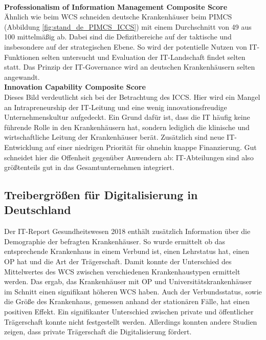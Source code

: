 \vspace{\parheadvspace}\\
\textbf{Professionalism of Information Management Composite Score}\\
Ähnlich wie beim WCS schneiden deutsche Krankenhäuser beim PIMCS (Abbildung \ref{fig:stand_de_PIMCS_ICCS}) mit einem Durchschnitt von 49 aus 100 mittelmäßig ab. Dabei sind die Defizitbereiche auf der taktische und insbesondere auf der strategischen Ebene. So wird der potentielle Nutzen von IT-Funktionen selten untersucht und Evaluation der IT-Landschaft findet selten statt. Das Prinzip der IT-Governance wird an deutschen Krankenhäusern selten angewandt.
\vspace{\parheadvspace}\\
\textbf{Innovation Capability Composite Score}\\
Dieses Bild verdeutlicht sich bei der Betrachtung des ICCS. Hier wird ein Mangel an Intrapreneurship der IT-Leitung und eine wenig innovationsfreudige Unternehmenskultur aufgedeckt. Ein Grund dafür ist, dass die IT häufig keine führende Rolle in den Krankenhäusern hat, sondern lediglich die klinische und wirtschaftliche Leitung der Krankenhäuser berät. Zusätzlich sind neue IT-Entwicklung auf einer niedrigen Priorität für ohnehin knappe Finanzierung. Gut schneidet hier die Offenheit gegenüber Anwendern ab: IT-Abteilungen sind also größtenteils gut in das Gesamtunternehmen integriert.
\subsection{Treibergrößen für Digitalisierung in Deutschland}
Der IT-Report Gesundheitswesen 2018 enthält zusätzlich Information über die Demographie der befragten Krankenhäuser. So wurde ermittelt ob das entsprechende Krankenhaus in einem Verbund ist, einen Lehrstatus hat, einen OP hat und die Art der Trägerschaft. Damit konnte der Unterschied des Mittelwertes des WCS zwischen verschiedenen Krankenhaustypen ermittelt werden. Das ergab, das Krankenhäuser mit OP und Universitätskrankenhäuser im Schnitt einen signifikant höheren WCS haben. Auch der Verbundsstatus, sowie die Größe des Krankenhaus, gemessen anhand der stationären Fälle, hat einen positiven Effekt. \parencite{huebner2019}
Ein signifikanter Unterschied zwischen private und öffentlicher Trägerschaft konnte nicht festgestellt werden. Allerdings konnten andere Studien \parencite{cresswell2013} zeigen, dass private Trägerschaft die Digitalisierung fördert.

